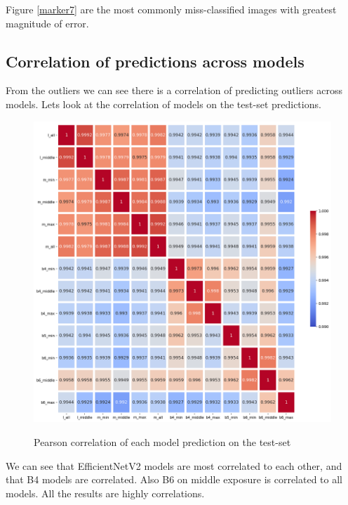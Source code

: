 \documentclass[10pt,letterpaper]{article}
\begin{document}
Figure \ref{marker7} are the most commonly miss-classified images 
with greatest magnitude of error.

\subsection*{Correlation of predictions across models}

From the outliers we can see there is a correlation of predicting outliers across models. 
Lets look at the correlation of models on the test-set predictions.

\begin{figure}[h!]
  \caption{Pearson correlation of each model prediction on the test-set}
  \centering
  \includegraphics[scale=0.5]{results/eda/pearson_corr_models.png}
  \label{marker11}
\end{figure}

We can see that EfficientNetV2 models are most correlated to each other, and that B4 models are correlated.
Also B6 on middle exposure is correlated to all models. All the results are highly correlations. 
\end{document}
